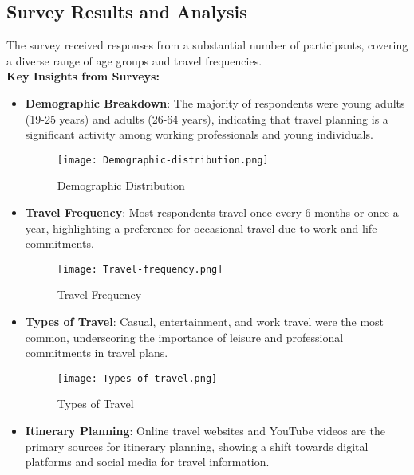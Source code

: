 \documentclass[conference]{IEEEtran}
\begin{document}
    \subsection{Survey Results and Analysis}
        The survey received responses from a substantial number of participants, covering a diverse range of age groups and travel frequencies.
        \\

        \textbf{Key Insights from Surveys:}

        \begin{itemize}
            \item \textbf{Demographic Breakdown}: The majority of respondents were young adults (19-25 years) and adults (26-64 years), indicating that travel planning is a significant activity among working professionals and young individuals.
            \begin{figure}
                \centering
                \texttt{[image: Demographic-distribution.png]}
                \caption{Demographic Distribution}
                \label{fig:demographic-distribution}
            \end{figure}
            \item \textbf{Travel Frequency}: Most respondents travel once every 6 months or once a year, highlighting a preference for occasional travel due to work and life commitments.
            \begin{figure}
                \centering
                \texttt{[image: Travel-frequency.png]}
                \caption{Travel Frequency}
                \label{fig:travel-frequency}
            \end{figure}
            \item \textbf{Types of Travel}: Casual, entertainment, and work travel were the most common, underscoring the importance of leisure and professional commitments in travel plans.
            \begin{figure}
                \centering
                \texttt{[image: Types-of-travel.png]}
                \caption{Types of Travel}
                \label{fig:types-of-travel}
            \end{figure}
            \item \textbf{Itinerary Planning}: Online travel websites and YouTube videos are the primary sources for itinerary planning, showing a shift towards digital platforms and social media for travel information.
            \begin{figure}

\end{figure}
\end{itemize}
\end{document}

